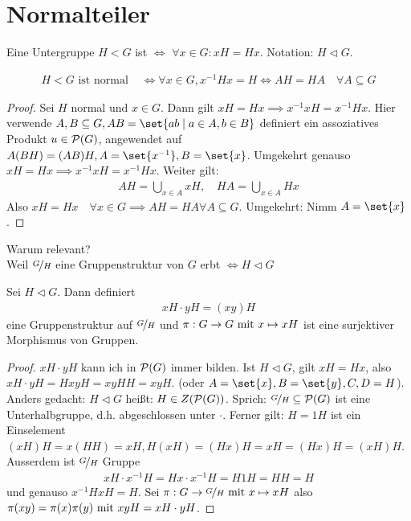 \section{Normalteiler}
\begin{definition}
	Eine Untergruppe $H < G$ ist  $\Leftrightarrow$ $\forall x \in G\colon xH = Hx$. Notation: $H \lhd G$.
\end{definition}
\begin{proposition}
	\begin{align*}
		H < G \text{ ist normal } &\Leftrightarrow \forall x \in G, x^{-1}Hx = H \Leftrightarrow AH = HA \quad \forall A \subseteq G
	\end{align*}
\end{proposition}
\begin{proof}
	Sei $H$ normal und $x \in G$. Dann gilt $xH = Hx \implies x^{-1}xH = x^{-1}Hx$. Hier verwende $A,B \subseteq G, AB = \set{ab \mid a \in A, b \in B}$ definiert ein assoziatives Produkt $u \in \powerset(G)$, angewendet auf $A(BH) = (AB)H, A = \set{x^{-1}}, B=\set{x}$. Umgekehrt genauso $xH = Hx \implies x^{-1}xH = x^{-1}Hx$. Weiter gilt:
	\begin{align*}
		AH = \bigcup_{x \in A} x H, \quad HA = \bigcup_{x \in A} Hx
	\end{align*}
	Also $xH = Hx\quad \forall x \in G \implies AH=HA \forall A \subseteq G$. Umgekehrt: Nimm $A = \set{x}$.
\end{proof}
Warum relevant?\\
Weil $\lnkset{G}{H}$ eine Gruppenstruktur von $G$ erbt $\Leftrightarrow H \lhd G$
\begin{proposition}
	Sei $H \lhd G$. Dann definiert
	\begin{align*}
		xH \cdot yH = (xy)H
	\end{align*}
	eine Gruppenstruktur auf $\lnkset{G}{H}$ und $\pi: G \to G \mit x \mapsto xH$ ist eine surjektiver Morphismus von Gruppen.
\end{proposition}
\begin{proof}
	$xH \cdot yH$ kann ich in $\powerset(G)$ immer bilden. Ist $H \lhd G$, gilt $xH = Hx$, also $xH\cdot yH = HxyH = xyHH = xyH$. (oder $A=\set{x}, B = \set{y}, C,D=H$). Anders gedacht: $H \lhd G$ heißt: $H \in Z(\powerset(G))$. Sprich: $\lnkset{G}{H} \subseteq \powerset(G)$ ist eine Unterhalbgruppe, d.h. abgeschlossen unter $\cdot$. Ferner gilt: $H = 1H$ ist ein Einselement $(xH)H = x(HH) = xH, H(xH) = (Hx)H = xH=(Hx)H=(xH)H$. Ausserdem ist $\lnkset{G}{H}$ Gruppe 
	\begin{align*}
		xH \cdot x^{-1}H = Hx\cdot x^{-1}H = H1H = HH = H
	\end{align*}
	und genauso $x^{-1}HxH = H$. Sei $\pi: G \to \lnkset{G}{H} \mit x \mapsto xH$ also $\pi(xy) = \pi(x)\pi(y) \mit xyH = xH \cdot yH$.
\end{proof}
